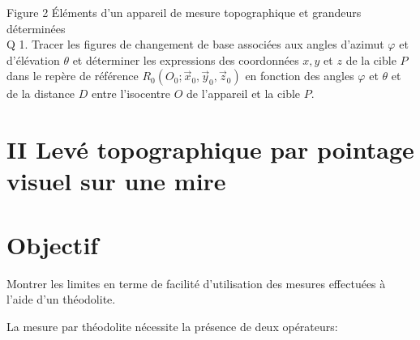 \documentclass[10pt]{article}
\begin{document}
Figure 2 Éléments d'un appareil de mesure topographique et grandeurs déterminées\\
Q 1. Tracer les figures de changement de base associées aux angles d'azimut $\varphi$ et d'élévation $\theta$ et déterminer les expressions des coordonnées $x, y$ et $z$ de la cible $P$ dans le repère de référence $R_{0}\left(O_{0} ; \vec{x}_{0}, \vec{y}_{0}, \vec{z}_{0}\right)$ en fonction des angles $\varphi$ et $\theta$ et de la distance $D$ entre l'isocentre $O$ de l'appareil et la cible $P$.

\section*{II Levé topographique par pointage visuel sur une mire}
\section*{Objectif}
Montrer les limites en terme de facilité d'utilisation des mesures effectuées à l'aide d'un théodolite.

La mesure par théodolite nécessite la présence de deux opérateurs:
\end{document}
